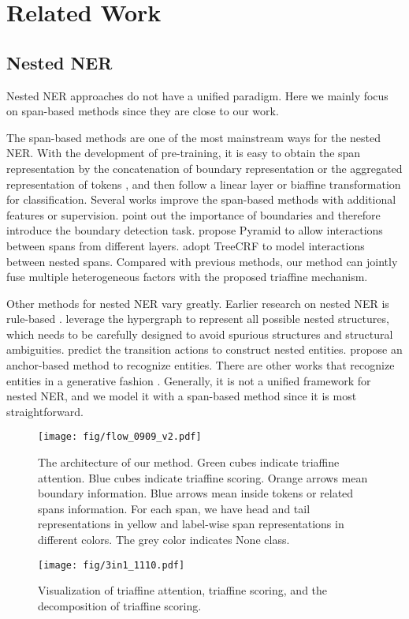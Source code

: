 \documentclass[11pt]{article}
\begin{document}
\section{Related Work}
\subsection{Nested NER}
Nested NER approaches do not have a unified paradigm.
Here we mainly focus on span-based methods since they are close to our work.

The span-based methods are one of the most mainstream ways for the nested NER. With the development of pre-training, it is easy to obtain the span representation by the concatenation of boundary representation \cite{dygie,zhong2021frustratingly} or the aggregated representation of tokens \cite{zheng2019boundary,wadden2019entity}, and then follow a linear layer \cite{mgner} or biaffine transformation \cite{yu2020named} for classification. Several works improve the span-based methods with additional features or supervision. \citet{zheng2019boundary,bensc} point out the importance of boundaries and therefore introduce the boundary detection task.
\citet{wang2020pyramid} propose Pyramid to allow interactions between spans from different layers.
\citet{fu2021nested} adopt TreeCRF to model interactions between nested spans.
Compared with previous methods, our method can jointly fuse multiple heterogeneous factors with the proposed triaffine mechanism.

Other methods for nested NER vary greatly. Earlier research on nested NER is rule-based \cite{zhang2004enhancing}. \citet{lu2015joint,katiyar2018nested,sh} leverage the hypergraph to represent all possible nested structures, which needs to be carefully designed to avoid spurious structures and structural ambiguities.
\citet{trans,mergelabel} predict the transition actions to construct nested entities. \citet{lin2019sequence} propose an anchor-based method to recognize entities. There are other works that recognize entities in a generative fashion \cite{bartner,shen2021locate,tan2021sequence}. Generally, it is not a unified framework for nested NER, and we model it with a span-based method since it is most straightforward.


\begin{figure*}[ht]
\centering
\texttt{[image: fig/flow\_0909\_v2.pdf]}
\caption{The architecture of our method.
Green cubes indicate triaffine attention. Blue cubes indicate triaffine scoring.
Orange arrows mean boundary information. 
Blue arrows mean inside tokens or related spans information.
For each span, we have head and tail representations in yellow and label-wise span representations in different colors.
The grey color indicates None class.
}
\label{arch}
\centering
\texttt{[image: fig/3in1\_1110.pdf]}
\caption{Visualization of triaffine attention, triaffine scoring, and the decomposition of triaffine scoring.}
\label{tri}
\end{figure*}
\end{document}
